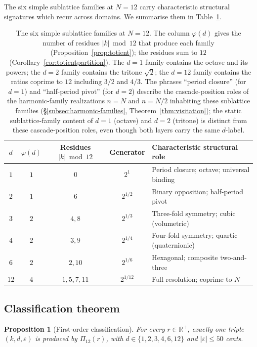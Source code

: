 \documentclass[11pt,a4paper]{article}
\newtheorem{proposition}[theorem]{Proposition}
\theoremstyle{definition}
\theoremstyle{remark}
\newcommand{\R}{\mathbb{R}}
\newcommand{\eps}{\varepsilon}
\begin{document}
The six simple sublattice families at $N=12$ carry characteristic structural signatures which recur across domains. We summarise them in Table~\ref{tab:families}.

\begin{table}[h]
\centering
\begin{tabular}{@{}c c c c l@{}}
\toprule
$d$ & $\varphi(d)$ & Residues $|k|\bmod 12$ & Generator & Characteristic structural role\\
\midrule
$1$ & $1$ & $0$ & $2^{1}$ & Period closure; octave; universal binding\\
$2$ & $1$ & $6$ & $2^{1/2}$ & Binary opposition; half-period pivot\\
$3$ & $2$ & $4,8$ & $2^{1/3}$ & Three-fold symmetry; cubic (volumetric)\\
$4$ & $2$ & $3,9$ & $2^{1/4}$ & Four-fold symmetry; quartic (quaternionic)\\
$6$ & $2$ & $2,10$ & $2^{1/6}$ & Hexagonal; composite two-and-three\\
$12$ & $4$ & $1,5,7,11$ & $2^{1/12}$ & Full resolution; coprime to $N$\\
\bottomrule
\end{tabular}
\caption{The six simple sublattice families at $N=12$. The column $\varphi(d)$ gives the number of residues $|k|\bmod 12$ that produce each family (Proposition~\ref{prop:totient}); the residues sum to $12$ (Corollary~\ref{cor:totientpartition}). The $d=1$ family contains the octave and its powers; the $d=2$ family contains the tritone $\sqrt{2}$; the $d=12$ family contains the ratios coprime to $12$ including $3/2$ and $4/3$. The phrases ``period closure'' (for $d=1$) and ``half-period pivot'' (for $d=2$) describe the cascade-position roles of the harmonic-family realizations $n=N$ and $n=N/2$ inhabiting these sublattice families (\S\ref{subsec:harmonic-families}, Theorem~\ref{thm:visitation}); the static sublattice-family content of $d=1$ (octave) and $d=2$ (tritone) is distinct from these cascade-position roles, even though both layers carry the same $d$-label.}
\label{tab:families}
\end{table}

\subsection{Classification theorem}

\begin{proposition}[First-order classification]\label{prop:classification}
For every $r\in\R^{+}$, exactly one triple $(k,d,\eps)$ is produced by $\Pi_{12}(r)$, with $d\in\{1,2,3,4,6,12\}$ and $|\eps|\le 50$ cents.
\end{proposition}
\end{document}
